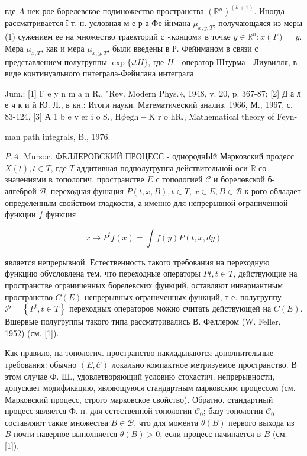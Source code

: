 \documentclass[10pt]{article}
\begin{document}
где $A$-нек-рое борелевское подмножество пространства $\left(\mathbb{R}^{n}\right)^{(k+1)}$. Иногда рассматривается ї т. н. условная м е р а Фе йнмана $\mu_{x, y, T}$, получающаяся из меры (1) сужением ее на множөство траекторий с «концом» в точке $y \in \mathbb{R}^{n}: x(T)=y$. Мера $\mu_{x, T}$, как и мера $\mu_{x, y, T}$, были введены в Р. Фейнманом в связи с представлением полугруппы $\exp \{i t H\}$, где $H$ - оператор Штурма - Лиувилля, в виде континуального пнтеграла-Фейнлана интеграла.



Jum.: [1] F e y n m a n R., "Rev. Modern Phys.», 1948, v. 20, p. 367-87; [2] Д а л е ч к и й Ю. Л., в кн.: Итоги науки. Математический анализ. 1966, М., 1967, с. 83-124, [3] А 1 b e v e$\mathrm{r}$ i o S., $\mathrm{H} \phi \mathrm{egh}-\mathrm{K}$ r o $\mathrm{h} \mathrm{R}$., Mathematical theory of Feyn-

man path integrals, B., 1976.

$P . A$. Mursoc. ФЕЛЛЕРОВСКИЙ ПРОЦЕСС - однороднЫй Марковский продесс $X(t), t \in T$, где $T$-аддитивная подполугруппа действительной оси $\mathbb{R}$ со значениями в топологич. пространстве $E$ с топологией $\mathscr{C}$ и борелөвской б-алгеброй $\mathscr{B}$, переходная функция $P(t, x, B), t \in T$, $x \in E, B \in \mathscr{B}$ к-рого обладает определенным свойством гладкости, а именно для непрерывной ограниченной функции $f$ функция



\[

x \longmapsto P^{t} f(x)=\int f(y) P(t, x, d y)

\]



является непрерывной. Естественность такого требования на переходную функцию обусловлена тем, что переходные операторы $P t, t \in T$, действующие на пространстве ограниченных борелевских функций, оставляют инвариантным пространство $C(E)$ непрерывных ограниченных функций, т е. полугруппу $\mathscr{P}=\left\{P^{t}, t \in T\right\}$ переходных операторов можно считать действующей на $C(E)$. Вшөрвые полугруппы такого типа рассматривались В. Феллером (W. Feller, 1952) (см. [1]).



Как правило, на топологич. пространство накладываются дополнительные требования: обычно $(E, \mathscr{C})$ локально компактное метризуемое пространство. В этом случае Ф. Ш., удовлетворяющий условию стохастич. непрерывности, допускает модификацию, являющуюся стандартным марковским процессом (см. Марковский процесс, строго марковское свойство). Обратно, стандартный процесс является Ф. п. для естественной топологии $\mathscr{C}_{0}$; базу топологии $\mathscr{C}_{0}$ составляют такие множества $B \in \mathscr{B}$, что для момента $\theta(B)$ первого выхода из $B$ почти наверное выполняется $\theta(B)>0$, если процесс начинается в $B$ (см. [1]).
\end{document}
